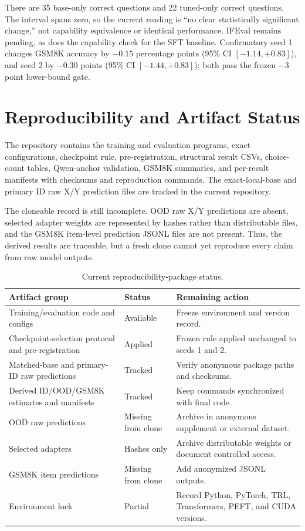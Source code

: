 \documentclass[11pt,letterpaper]{article}
\begin{document}
There are 35 base-only correct questions and 22 tuned-only correct questions.
The interval spans zero, so the current reading is ``no clear statistically
significant change,'' not capability equivalence or identical performance.
IFEval \citep{zhou2023ifeval} remains pending, as does the capability check for
the SFT baseline. Confirmatory seed 1 changes GSM8K accuracy by $-0.15$
percentage points (95\% CI $[-1.14,+0.83]$), and seed 2 by $-0.30$ points
(95\% CI $[-1.44,+0.83]$); both pass the frozen $-3$ point lower-bound gate.

\FloatBarrier
\section{Reproducibility and Artifact Status}

The repository contains the training and evaluation programs, exact
configurations, checkpoint rule, pre-registration, structural result CSVs,
choice-count tables, Qwen-anchor validation, GSM8K summaries, and per-result
manifests with checksums and reproduction commands. The exact-local-base and
primary ID raw X/Y prediction files are tracked in the current repository.

The cloneable record is still incomplete. OOD raw X/Y predictions are absent,
selected adapter weights are represented by hashes rather than distributable
files, and the GSM8K item-level prediction JSONL files are not present. Thus,
the derived results are traceable, but a fresh clone cannot yet reproduce every
claim from raw model outputs.

\begin{table}[htbp]
\centering
\small
\begin{tabular}{p{}p{}p{}}
\toprule
Artifact group & Status & Remaining action \\
\midrule
Training/evaluation code and configs & Available & Freeze environment and version record. \\
Checkpoint-selection protocol and pre-registration & Applied & Frozen rule applied unchanged to seeds 1 and 2. \\
Matched-base and primary-ID raw predictions & Tracked & Verify anonymous package paths and checksums. \\
Derived ID/OOD/GSM8K estimates and manifests & Tracked & Keep commands synchronized with final code. \\
OOD raw predictions & Missing from clone & Archive in anonymous supplement or external dataset. \\
Selected adapters & Hashes only & Archive distributable weights or document controlled access. \\
GSM8K item predictions & Missing from clone & Add anonymized JSONL outputs. \\
Environment lock & Partial & Record Python, PyTorch, TRL, Transformers, PEFT, and CUDA versions. \\
\bottomrule
\end{tabular}
\caption{Current reproducibility-package status.}
\label{tab:artifacts}
\end{table}
\end{document}
